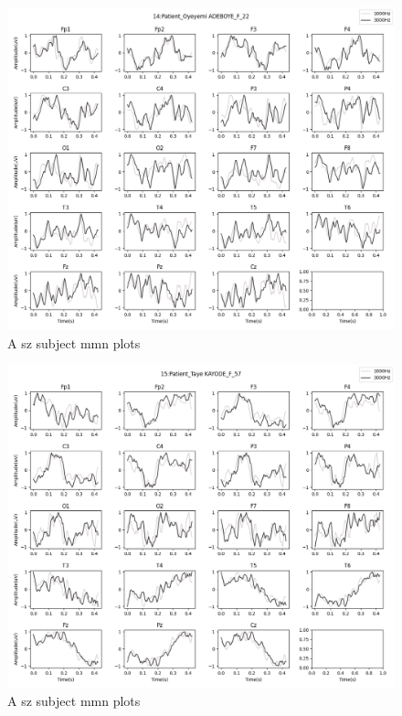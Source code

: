 \documentclass[10pt]{article}
\begin{document}
\begin{figure}[H]
  \includegraphics[width=16cm]{../../../data_analysis_results/MMN/time_series/Patient/14.png}
  \caption{A \gls{sz} subject \gls{mmn} plots}
\end{figure}
\begin{figure}[H]
  \includegraphics[width=16cm]{../../../data_analysis_results/MMN/time_series/Patient/15.png}
  \caption{A \gls{sz} subject \gls{mmn} plots}
\end{figure}
\end{document}
